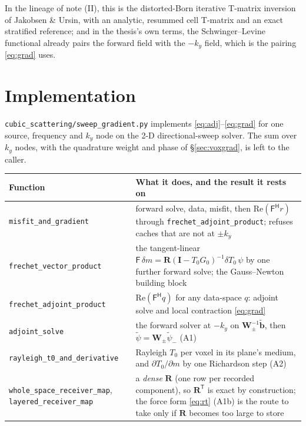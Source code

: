 \documentclass[11pt,a4paper]{article}
\newcommand{\Tz}{T_0}
\newcommand{\Gz}{G_0}
\newcommand{\bR}{\mathbf{R}}
\newcommand{\bI}{\mathbf{I}}
\newcommand{\T}{\mathsf{T}}
\begin{document}
In the lineage of note (II), this is the distorted-Born iterative T-matrix inversion of Jakobsen
\& Ursin, with an analytic, resummed cell T-matrix and an exact stratified reference; and in the
thesis's own terms, the Schwinger--Levine functional already pairs the forward field with the
$-k_y$ field, which is the pairing \eqref{eq:grad} uses.

\section{Implementation}\label{sec:impl}

\nolinkurl{cubic_scattering/sweep_gradient.py} implements \eqref{eq:adj}--\eqref{eq:grad} for one
source, frequency and $k_y$ node on the 2\textonehalf-D directional-sweep solver. The sum over
$k_y$ nodes, with the quadrature weight and phase of \S\ref{sec:voxgrad}, is left to the caller.

\begin{center}
\small
\begin{tabular}{@{}L{0.30\textwidth}L{0.62\textwidth}@{}}
\toprule
Function & What it does, and the result it rests on \\
\midrule
\nolinkurl{misfit_and_gradient} & forward solve, data, misfit, then $\mathrm{Re}(\mathsf{F}^{\mathsf H}r)$
  through \nolinkurl{frechet_adjoint_product}; refuses caches that are not at $\pm k_y$ \\
\nolinkurl{frechet_vector_product} & the tangent-linear $\mathsf{F}\,\delta m = \bR(\bI-\Tz\Gz)^{-1}\delta\Tz\,\psi$
  by one further forward solve; the Gauss--Newton building block \\
\nolinkurl{frechet_adjoint_product} & $\mathrm{Re}(\mathsf{F}^{\mathsf H}q)$ for any data-space $q$:
  adjoint solve and local contraction \eqref{eq:grad} \\
\nolinkurl{adjoint_solve} & the forward solver at $-k_y$ on $\mathbf{W}_{\pm}^{-1}\tilde{\mathbf b}$, then $\tilde\psi=\mathbf{W}_{\pm}\tilde\psi_{-}$ (A1) \\
\nolinkurl{rayleigh_t0_and_derivative} & Rayleigh $\Tz$ per voxel in its plane's medium, and
  $\partial\Tz/\partial m$ by one Richardson step (A2) \\
\nolinkurl{whole_space_receiver_map}, \nolinkurl{layered_receiver_map} & a \emph{dense} $\bR$
  (one row per recorded component), so $\bR^{\T}$ is exact by construction; the force form
  \eqref{eq:rt} (A1b) is the route to take only if $\bR$ becomes too large to store \\
\bottomrule
\end{tabular}
\end{center}
\end{document}
